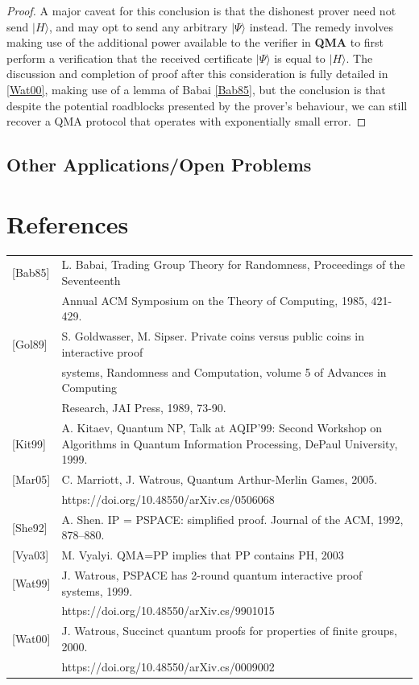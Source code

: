 \documentclass[12pt]{article}
\newcommand{\ket}[1]{\vert #1 \rangle}
\begin{document}
\begin{proof}
		A major caveat for this conclusion is that the dishonest prover need not send $\ket{H}$, and may opt to send any arbitrary $\ket{\Psi}$ instead. The remedy involves making use of the additional power available to the verifier in \textbf{QMA} to first perform a verification that the received certificate $\ket{\Psi}$ is equal to $\ket{H}$. The discussion and completion of proof after this consideration is fully detailed in \hyperref[wat00]{[Wat00]}, making use of a lemma of Babai \hyperref[bab85]{[Bab85]}, but the conclusion is that despite the potential roadblocks presented by the prover's behaviour, we can still recover a QMA protocol that operates with exponentially small error.
	\end{proof}

    \subsection{Other Applications/Open Problems}
	
	\newpage	
	\section*{References}
	\begin{tabular}{ l l }
		\label{bab}[Bab85] & L. Babai, Trading Group Theory for Randomness, Proceedings of the Seventeenth\\& Annual ACM
		Symposium on the Theory of Computing, 1985, 421-429.\\
		\label{gol89}[Gol89] & S. Goldwasser, M. Sipser. Private coins versus public coins in interactive proof \\& systems, Randomness and Computation, volume 5 of Advances in Computing\\& Research, JAI Press, 1989, 73-90.\\
		\label{kit99}[Kit99] & A. Kitaev, Quantum NP, Talk at AQIP’99: Second Workshop on Algorithms in Quantum
		Information Processing, DePaul University, 1999.\\
		\label{mar05}[Mar05] & C. Marriott, J. Watrous, Quantum Arthur-Merlin Games, 2005. \\&https://doi.org/10.48550/arXiv.cs/0506068\\
		\label{she92}[She92] & A. Shen. IP = PSPACE: simplified proof. Journal of the ACM, 1992, 878–880.\\
		\label{vya03}[Vya03] & M. Vyalyi. QMA=PP implies that PP contains PH, 2003\\
		\label{wat99}[Wat99] & J. Watrous, PSPACE has 2-round quantum interactive proof systems, 1999. \\&https://doi.org/10.48550/arXiv.cs/9901015\\
		\label{wat00}[Wat00] & J. Watrous, Succinct quantum proofs for properties of finite groups, 2000. \\&https://doi.org/10.48550/arXiv.cs/0009002\\
		
	\end{tabular}
	
		
\end{document}
